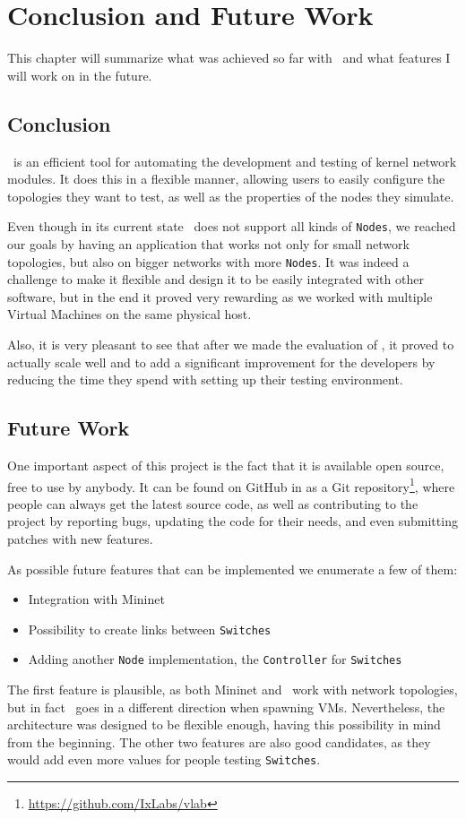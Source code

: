 \chapter{Conclusion and Future Work}
\label{chapter:Chapter 6}

This chapter will summarize what was achieved so far with \project\ and what features I will work on in the future.

\section{Conclusion}
\label{sec:conclusion}

\project\ is an efficient tool for automating the development and testing of kernel network modules.
It does this in a flexible manner, allowing users to easily configure the topologies they want to test, as well as the properties of the nodes they simulate.

Even though in its current state \project\ does not support all kinds of \texttt{Nodes}, we reached our goals by having an application that works not only for small network topologies, but also on bigger networks with more \texttt{Nodes}.
It was indeed a challenge to make it flexible and design it to be easily integrated with other software, but in the end it proved very rewarding as we worked with multiple Virtual Machines on the same physical host.

Also, it is very pleasant to see that after we made the evaluation of \project, it proved to actually scale well and to add a significant improvement for the developers by reducing the time they spend with setting up their testing environment.

\section{Future Work}
\label{sec:future-work}

One important aspect of this project is the fact that it is available open source, free to use by anybody.
It can be found on GitHub in as a Git repository\footnote{\url{https://github.com/IxLabs/vlab}}, where people can always get the latest source code, as well as contributing to the project by reporting bugs, updating the code for their needs, and even submitting patches with new features.

As possible future features that can be implemented we enumerate a few of them:
\begin{itemize}
  \item Integration with Mininet
  \item Possibility to create links between \texttt{Switches}
  \item Adding another \texttt{Node} implementation, the \texttt{Controller} for \texttt{Switches}
\end{itemize}

The first feature is plausible, as both Mininet and \project\ work with network topologies, but in fact \project\ goes in a different direction when spawning VMs.
Nevertheless, the architecture was designed to be flexible enough, having this possibility in mind from the beginning.
The other two features are also good candidates, as they would add even more values for people testing \texttt{Switches}.
